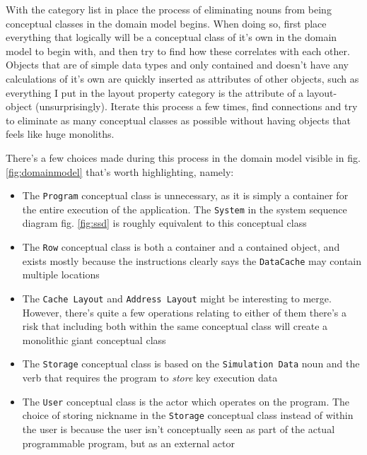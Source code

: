 \documentclass[a4paper]{scrreprt}
\begin{document}
With the category list in place the process of eliminating nouns from being conceptual classes in the domain model begins. When doing so, first place everything that logically will be a conceptual class of it's own in the domain model to begin with, and then try to find how these correlates with each other. Objects that are of simple data types and only contained and doesn't have any calculations of it's own are quickly inserted as attributes of other objects, such as everything I put in the layout property category is the attribute of a layout-object (unsurprisingly). Iterate this process a few times, find connections and try to eliminate as many conceptual classes as possible without having objects that feels like huge monoliths.

There's a few choices made during this process in the domain model visible in fig. \ref{fig:domainmodel} that's worth highlighting, namely:

\begin{itemize}
\item The \texttt{Program} conceptual class is unnecessary, as it is simply a container for the entire execution of the application. The \texttt{System} in the system sequence diagram fig. \ref{fig:ssd} is roughly equivalent to this conceptual class
\item The \texttt{Row} conceptual class is both a container and a contained object, and exists mostly because the instructions clearly says the \texttt{DataCache} may contain multiple locations
\item The \texttt{Cache Layout} and \texttt{Address Layout} might be interesting to merge. However, there's quite a few operations relating to either of them there's a risk that including both within the same conceptual class will create a monolithic giant conceptual class
\item The \texttt{Storage} conceptual class is based on the \texttt{Simulation Data} noun and the verb that requires the program to \textit{store} key execution data
\item The \texttt{User} conceptual class is the actor which operates on the program. The choice of storing nickname in the \texttt{Storage} conceptual class instead of within the user is because the user isn't conceptually seen as part of the actual programmable program, but as an external actor
\end{itemize}
\end{document}
